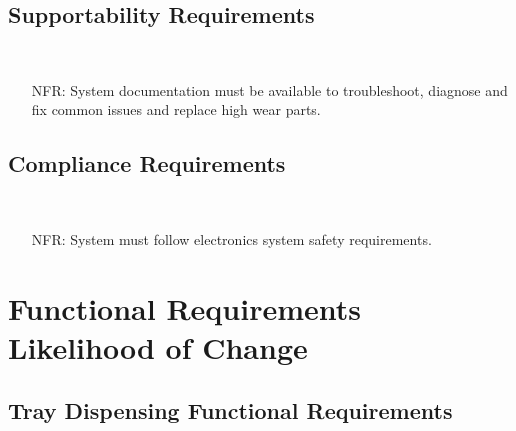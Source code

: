 \documentclass[12pt]{article}
\newcounter{nfrnum} %
\begin{document}
  \subsection{Supportability Requirements }\
  \noindent \begin{itemize}
  \item[NFR\refstepcounter{nfrnum}\thenfrnum \label{NFR_Supportability1}:]
  System documentation must be available to troubleshoot, diagnose and fix common issues and replace high wear parts.
  \end{itemize}

  \subsection{Compliance Requirements }\
  \noindent \begin{itemize}
  \item[NFR\refstepcounter{nfrnum}\thenfrnum \label{NFR_Compliance1}:]
  System must follow electronics system safety requirements.
  \end{itemize}
  

\section{Functional Requirements Likelihood of Change}

\subsection{Tray Dispensing Functional Requirements}
\end{document}
